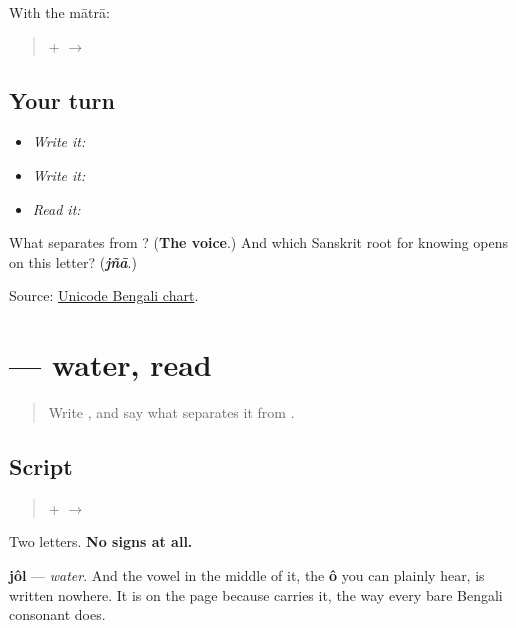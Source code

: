 With the mātrā:

\begin{quote}
\textbf{} + \textbf{} $\to$ \textbf{}
\end{quote}

\subsection*{Your turn}
\begin{itemize}
\raggedright
  \item \emph{Write it:} 
  \item \emph{Write it:}  
  \item \emph{Read it:} 
\end{itemize}

\begin{tcolorbox}[breakable,colback=teal!4,colframe=teal!35!black,title={Before you move on}]
What separates \textbf{} from \textbf{}? (\textbf{The voice}.) And which Sanskrit root for knowing opens on this letter? (\emph{\textbf{jñā}}.)

Source: \href{https://www.unicode.org/charts/PDF/U0980.pdf}{Unicode Bengali chart}.
\end{tcolorbox}
\section[jôl]{ — water, read}

\label{lesson:BN-W04-jol-read}



\begin{quote}
Write \textbf{}, and say what separates it from \textbf{}.
\end{quote}

\subsection*{Script}
\begin{quote}
\textbf{} + \textbf{} $\to$ \textbf{}
\end{quote}

Two letters. \textbf{No signs at all.}

\textbf{jôl} — \emph{water}. And the vowel in the middle of it, the \textbf{ô} you can plainly hear, is written nowhere. It is on the page because \textbf{} carries it, the way every bare Bengali consonant does.

